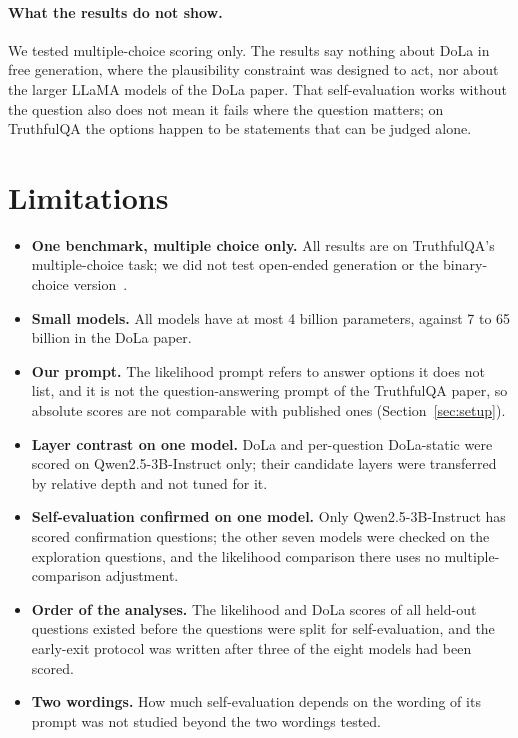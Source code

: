 \documentclass[11pt]{article}
\newcommand{\method}{per-question DoLa-static}
\newcommand{\mainmodel}{Qwen2.5-3B-Instruct}
\begin{document}
\paragraph{What the results do not show.}
We tested multiple-choice scoring only. The results say nothing about DoLa in free generation, where the
plausibility constraint was designed to act, nor about the larger LLaMA models of the DoLa paper. That self-evaluation
works without the question also does not mean it fails where the question matters; on TruthfulQA the options happen
to be statements that can be judged alone.

\section{Limitations}
\label{sec:limitations}
\begin{itemize}
\item \textbf{One benchmark, multiple choice only.} All results are on TruthfulQA's multiple-choice task; we did not
  test open-ended generation or the binary-choice version~\citep{evans2025improved}.
\item \textbf{Small models.} All models have at most 4 billion parameters, against 7 to 65 billion in the DoLa paper.
\item \textbf{Our prompt.} The likelihood prompt refers to answer options it does not list, and it is not the
  question-answering prompt of the TruthfulQA paper, so absolute scores are not comparable with published ones
  (Section~\ref{sec:setup}).
\item \textbf{Layer contrast on one model.} DoLa and \method{} were scored on \mainmodel{} only; their candidate
  layers were transferred by relative depth and not tuned for it.
\item \textbf{Self-evaluation confirmed on one model.} Only \mainmodel{} has scored confirmation questions; the other
  seven models were checked on the exploration questions, and the likelihood comparison there uses no
  multiple-comparison adjustment.
\item \textbf{Order of the analyses.} The likelihood and DoLa scores of all held-out questions existed before the
  questions were split for self-evaluation, and the early-exit protocol was written after three of the eight models
  had been scored.
\item \textbf{Two wordings.} How much self-evaluation depends on the wording of its prompt was not studied beyond the
  two wordings tested.
\end{itemize}
\end{document}
